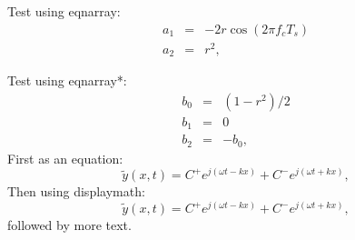\documentclass[12pt]{amsart}
\begin{document}
Test using eqnarray:
\begin{eqnarray}
a_1 &=& -2 r \cos( 2 \pi f_c T_s ) \\
a_2 &=& r^2,
\end{eqnarray}

Test using eqnarray*:
\begin{eqnarray*}
b_0 &=& (1 - r^2) / 2 \\
b_1 &=& 0 \\
b_2 &=& -b_0,
\end{eqnarray*}
First as an equation:
\begin{equation}
\tilde{y}(x,t) = C^{+} e^{j (\omega t - k x)} + C^{-} e^{j (\omega t + k x)},
\label{eq:yxt}
\end{equation}
Then using displaymath:
\begin{displaymath}
  \tilde{y}(x,t) = C^{+} e^{j (\omega t - k x)} + C^{-} e^{j (\omega t + k x)},
\end{displaymath}
followed by more text.
\end{document}
